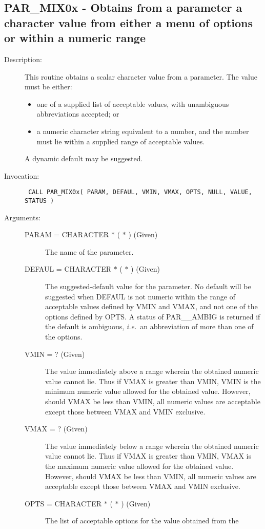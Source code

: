 \documentclass[twoside,11pt]{article}
\newcommand{\xlabel}[1]{}
\newlength{\sstbannerlength}
\newlength{\sstcaptionlength}
\newlength{\sstexampleslength}
\newlength{\sstexampleswidth}
\newcommand{\sstroutine}[3]{
   \goodbreak
   \rule{\textwidth}{0.5mm}
   \vspace{-7ex}
   \newline
   \settowidth{\sstbannerlength}{{\Large {\bf #1}}}
   \setlength{\sstcaptionlength}{\textwidth}
   \setlength{\sstexampleslength}{\textwidth}
   \addtolength{\sstbannerlength}{0.5em}
   \addtolength{\sstcaptionlength}{-2.0\sstbannerlength}
   \addtolength{\sstcaptionlength}{-5.0pt}
   \settowidth{\sstexampleswidth}{{\bf Examples:}}
   \addtolength{\sstexampleslength}{-\sstexampleswidth}
   \parbox[t]{\sstbannerlength}{\flushleft{\Large {\bf #1}}}
   \parbox[t]{\sstcaptionlength}{\center{\Large #2}}
   \parbox[t]{\sstbannerlength}{\flushright{\Large {\bf #1}}}
   \begin{description}
      #3
   \end{description}
}
\newcommand{\sstdescription}[1]{\item[Description:] #1}
\newcommand{\sstinvocation}[1]{\item[Invocation:]\hspace{0.4em}{\tt #1}}
\newcommand{\sstarguments}[1]{
   \item[Arguments:] \mbox{} \\
   \vspace{-3.5ex}
   \begin{description}
      #1
   \end{description}
}
\newcommand{\sstsubsection}[1]{ \item[{#1}] \mbox{} \\}
\newcommand{\ssttt}{\tt}
\renewcommand{\sstroutine}[3]{
      \subsection{\xlabel{12}#1\xlabel{#1}-\label{#1}#2}
      \begin{description}
         #3
      \end{description}
   }
\renewcommand{\sstdescription}[1]{\item[Description:]
      \begin{description}
         #1
      \end{description}
   }
\renewcommand{\sstinvocation}[1]{\item[Invocation:]
      \begin{description}
         {\ssttt #1}
      \end{description}
   }
\renewcommand{\sstarguments}[1]{
      \item[Arguments:]
      \begin{description}
         #1
      \end{description}
   }
\renewcommand{\sstsubsection}[1]{\item[{#1}]}
\begin{document}
\sstroutine{
   PAR\_MIX0x
}{
   Obtains from a parameter a character value from either a menu of
   options or within a numeric range
}{
   \sstdescription{
      This routine obtains a scalar character value from a parameter.
      The value must be either:
      \begin{itemize}
         \item one of a supplied list of acceptable values, with
            unambiguous abbreviations accepted; or

         \item a numeric character string equivalent to a number, and the
            number must lie within a supplied range of acceptable
            values.
      \end{itemize}

      A dynamic default may be suggested.
   }
   \sstinvocation{
      CALL PAR\_MIX0x( PARAM, DEFAUL, VMIN, VMAX, OPTS, NULL, VALUE,
                      STATUS )
   }
   \sstarguments{
      \sstsubsection{
         PARAM = CHARACTER $*$ ( $*$ ) (Given)
      }{
         The name of the parameter.
      }
      \sstsubsection{
         DEFAUL = CHARACTER $*$ ( $*$ ) (Given)
      }{
         The suggested-default value for the parameter.  No default
         will be suggested when DEFAUL is not numeric within the range
         of acceptable values defined by VMIN and VMAX, and not one of
         the options defined by OPTS.  A status of PAR\_\_AMBIG is
         returned if the default is ambiguous, {\it i.e.}\ an abbreviation of
         more than one of the options.
      }
      \sstsubsection{
         VMIN = ? (Given)
      }{
        The value immediately above a range wherein the obtained
         numeric value cannot lie.  Thus if VMAX is greater than VMIN,
         VMIN is the minimum numeric value allowed for the obtained
         value.  However, should VMAX be less than VMIN, all numeric
         values are acceptable except those between VMAX and VMIN
         exclusive.
      }
      \sstsubsection{
         VMAX = ? (Given)
      }{
         The value immediately below a range wherein the obtained
         numeric value cannot lie.  Thus if VMAX is greater than VMIN,
         VMAX is the maximum numeric value allowed for the obtained
         value.  However, should VMAX be less than VMIN, all numeric
         values are acceptable except those between VMAX and VMIN
         exclusive.
      }
      \sstsubsection{
         OPTS = CHARACTER $*$ ( $*$ ) (Given)
      }{
         The list of acceptable options for the value obtained from the
}}}
\end{document}
